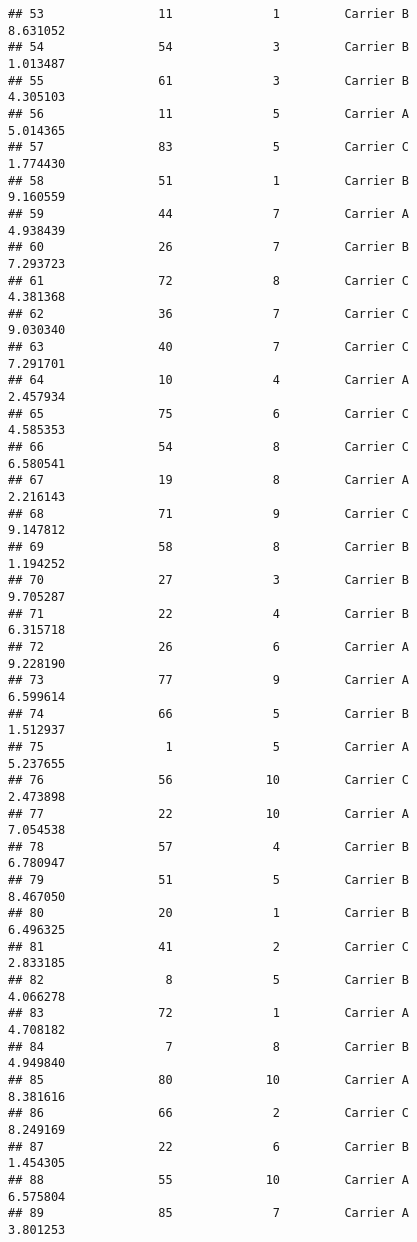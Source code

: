 \documentclass[
]{article}
\begin{document}
\begin{verbatim}
## 53                11              1         Carrier B       8.631052
## 54                54              3         Carrier B       1.013487
## 55                61              3         Carrier B       4.305103
## 56                11              5         Carrier A       5.014365
## 57                83              5         Carrier C       1.774430
## 58                51              1         Carrier B       9.160559
## 59                44              7         Carrier A       4.938439
## 60                26              7         Carrier B       7.293723
## 61                72              8         Carrier C       4.381368
## 62                36              7         Carrier C       9.030340
## 63                40              7         Carrier C       7.291701
## 64                10              4         Carrier A       2.457934
## 65                75              6         Carrier C       4.585353
## 66                54              8         Carrier C       6.580541
## 67                19              8         Carrier A       2.216143
## 68                71              9         Carrier C       9.147812
## 69                58              8         Carrier B       1.194252
## 70                27              3         Carrier B       9.705287
## 71                22              4         Carrier B       6.315718
## 72                26              6         Carrier A       9.228190
## 73                77              9         Carrier A       6.599614
## 74                66              5         Carrier B       1.512937
## 75                 1              5         Carrier A       5.237655
## 76                56             10         Carrier C       2.473898
## 77                22             10         Carrier A       7.054538
## 78                57              4         Carrier B       6.780947
## 79                51              5         Carrier B       8.467050
## 80                20              1         Carrier B       6.496325
## 81                41              2         Carrier C       2.833185
## 82                 8              5         Carrier B       4.066278
## 83                72              1         Carrier A       4.708182
## 84                 7              8         Carrier B       4.949840
## 85                80             10         Carrier A       8.381616
## 86                66              2         Carrier C       8.249169
## 87                22              6         Carrier B       1.454305
## 88                55             10         Carrier A       6.575804
## 89                85              7         Carrier A       3.801253

\end{verbatim}
\end{document}
